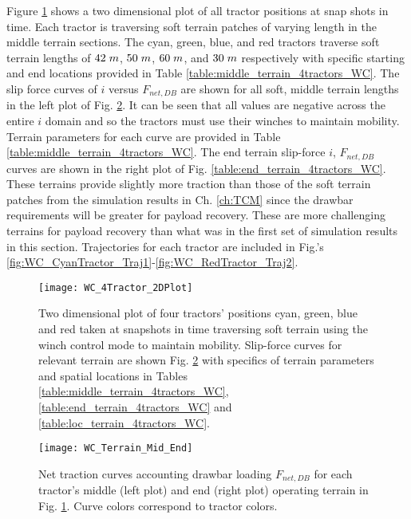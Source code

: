 Figure \ref{fig:WC_4Tractor_2DPlot} shows a two dimensional plot of all tractor positions at snap shots in time. Each tractor is traversing soft terrain patches of varying length in the middle terrain sections. The cyan, green, blue, and red tractors traverse soft terrain lengths of $42\hspace{1mm}m$, $50\hspace{1mm}m$, $60\hspace{1mm}m$, and $30\hspace{1mm}m$ respectively with specific starting and end locations provided in Table \ref{table:middle_terrain_4tractors_WC}. The slip force curves of $i$ versus $F_{net,DB}$ are shown for all soft, middle terrain lengths in the left plot of Fig. \ref{fig:WC_Terrain_Mid_End}. It can be seen that all values are negative across the entire $i$ domain and so the tractors must use their winches to maintain mobility. Terrain parameters for each curve are provided in Table \ref{table:middle_terrain_4tractors_WC}. The end terrain slip-force $i$, $F_{net,DB}$ curves are shown in the right plot of Fig. \ref{table:end_terrain_4tractors_WC}. These terrains provide slightly more traction than those of the soft terrain patches from the simulation results in Ch. \ref{ch:TCM} since the drawbar requirements will be greater for payload recovery. These are more challenging terrains for payload recovery than what was in the first set of simulation results in this section. Trajectories for each tractor are included in Fig.'s \ref{fig:WC_CyanTractor_Traj1}-\ref{fig:WC_RedTractor_Traj2}.
\begin{figure}[hb]
    \centering
    \texttt{[image: WC\_4Tractor\_2DPlot]}
    \caption{Two dimensional plot of four tractors' positions cyan, green, blue and red taken at snapshots in time traversing soft terrain using the winch control mode to maintain mobility. Slip-force curves for relevant terrain are shown Fig. \ref{fig:WC_Terrain_Mid_End} with specifics of terrain parameters and spatial locations in Tables \ref{table:middle_terrain_4tractors_WC}, \ref{table:end_terrain_4tractors_WC} and \ref{table:loc_terrain_4tractors_WC}.}
    \label{fig:WC_4Tractor_2DPlot}
\end{figure}
\begin{figure}[htbp]
    \centering
    \texttt{[image: WC\_Terrain\_Mid\_End]}
    \caption{Net traction curves accounting drawbar loading $F_{net,DB}$ for each tractor's middle (left plot) and end (right plot) operating terrain in Fig. \ref{fig:WC_4Tractor_2DPlot}. Curve colors correspond to tractor colors.}
    \label{fig:WC_Terrain_Mid_End}
\end{figure}
